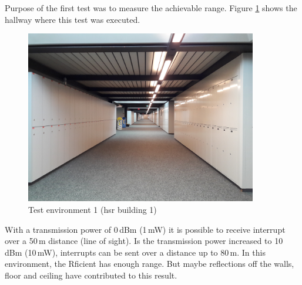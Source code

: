 Purpose of the first test was to measure the achievable range.
Figure \ref{development:env1} shows the hallway where this test was executed.
\begin{figure}[ht]
	\centering
	\includegraphics[width=0.9\textwidth]{4-development/hardware/graphics/env1.jpg}
	\caption{Test environment 1 (\acs{hsr} building 1)\label{development:env1}}
\end{figure}
With a transmission power of 0\,dBm (1\,mW) it is possible to receive interrupt over a 50\,m distance (line of sight).
Is the transmission power increased to 10\,dBm (10\,mW), interrupts can be sent over a distance up to 80\,m.
In this environment, the Rficient has enough range.
But maybe reflections off the walls, floor and ceiling have contributed to this result.

